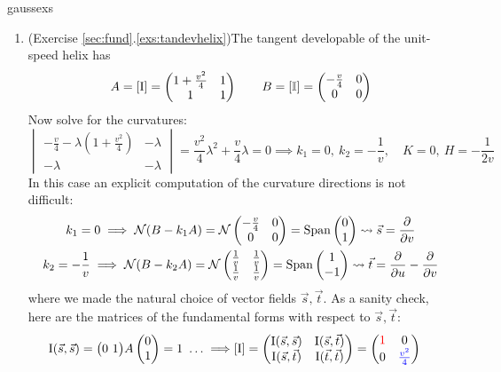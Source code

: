 \begin{examples}{}{gaussexs}
\begin{enumerate}
		\item\label{ex:tandevgauss} (Exercise \ref*{sec:fund}.\ref{exs:tandevhelix})\lstsp The tangent developable of the unit-speed helix has	
	  \[
	  	A=[\mathrm{I}]=
	  	\begin{pmatrix}
	  		1+\tfrac{v^2}{4}&1\\
	  		1&1
	  	\end{pmatrix}
	  	\qquad
	  	B=[\mathbb{I}]=
	  	\begin{pmatrix}
	  		-\tfrac{v}{4}&0\\
	  		0&0
	  	\end{pmatrix}
	  \]
	  Now solve for the curvatures:
	  \[
	  	\begin{vmatrix}
	  		-\frac v4-\lambda\left(1+\frac{v^2}4\right)&-\lambda\\
	  		-\lambda&-\lambda
	  	\end{vmatrix}
	  	=\frac{v^2}4\lambda^2+\frac v4\lambda=0
	  	\implies k_1=0,\  k_2=-\frac 1v,\quad K=0,\ H=-\frac 1{2v}
	  \]
	  In this case an explicit computation of the curvature directions is not difficult:
	  \begin{gather*}
	  	k_1=0\implies \mathcal{N}(B-k_1A)=\mathcal{N}
	  	\begin{pmatrix}
	  		-\frac v4&0\\
	  		0&0
	  	\end{pmatrix}
	  	=\operatorname{Span}\begin{pmatrix}0\\1\end{pmatrix} \rightsquigarrow \vec s=\frac{\partial }{\partial v}\\
	  	k_2=-\frac 1v\implies \mathcal{N}(B-k_2A)=\mathcal{N}
	  	\begin{pmatrix}
				\frac 1v&\frac 1v\\
	  		\frac 1v&\frac 1v
	  	\end{pmatrix}
	  	=\operatorname{Span}\begin{pmatrix}1\\-1\end{pmatrix} \rightsquigarrow \vec t=\frac{\partial }{\partial u}-\frac{\partial }{\partial v}
	  \end{gather*}
	  where we made the natural choice of vector fields $\vec s,\vec t$. As a sanity check, here are the matrices of the fundamental forms with respect to $\vec s,\vec t$:
	  \begin{align*}
	  	\I(\vec s,\vec s)=\bigl(0\ 1\bigr)A\twovec 01=1\ \ldots \implies
	  	&[\I]=
	  	\begin{pmatrix}
	  		\I(\vec s,\vec s)&\I(\vec s,\vec t)\\
	  		\I(\vec s,\vec t)&\I(\vec t,\vec t)
			\end{pmatrix}
			=
			\begin{pmatrix}
	  		\textcolor{red}{1}&0\\
	  		0&\textcolor{blue}{\frac{v^2}4}
	  	\end{pmatrix}

\end{align*}
\end{enumerate}
\end{examples}
